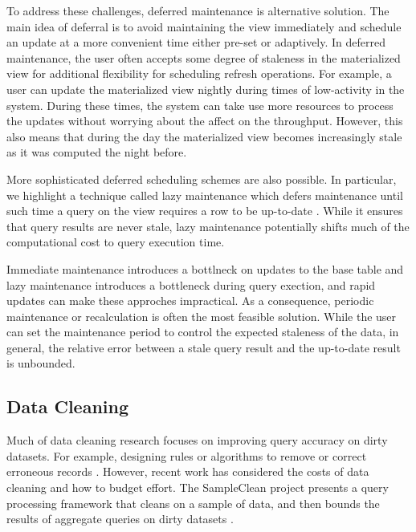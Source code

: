 To address these challenges, deferred maintenance is alternative solution.
The main idea of deferral is to avoid maintaining the view immediately and schedule an update at a more convenient time either pre-set or adaptively.
In deferred maintenance, the user often accepts some degree of staleness in 
the materialized view for additional flexibility for scheduling refresh operations.
For example, a user can update the materialized view nightly during times of low-activity in the system.
During these times, the system can take use more resources to process the updates without worrying about the affect on the throughput.
However, this also means that during the day the materialized view becomes increasingly stale as it was computed the night before.

More sophisticated deferred scheduling schemes are also possible.
In particular, we highlight a technique called lazy maintenance which defers maintenance until such time
a query on the view requires a row to be up-to-date \cite{zhou2007lazy}.
While it ensures that query results are never stale, lazy maintenance potentially shifts much of the computational cost to query execution time.

Immediate maintenance introduces a bottlneck on updates to the base table and lazy maintenance introduces a bottleneck during query exection,
and rapid updates can make these approches impractical.
As a consequence, periodic maintenance or recalculation is often the most feasible solution.
While the user can set the maintenance period to control the expected staleness of the data, in general, the relative error between a stale query result and the up-to-date result is unbounded.

\subsection{Data Cleaning}
Much of data cleaning research focuses on improving query accuracy on dirty datasets.
For example, designing rules or algorithms to remove or correct erroneous records \cite{rahm2000data}.
However, recent work has considered the costs of data cleaning and how to budget effort.
The SampleClean project presents a query processing framework that cleans on a sample of data, and then bounds the results of aggregate queries on dirty datasets \cite{wang1999sample}.

